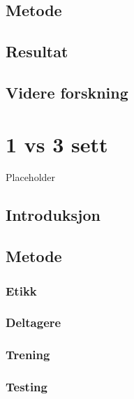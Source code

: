 \documentclass[
]{book}
\begin{document}
\hypertarget{metode-2}{%
\section{Metode}\label{metode-2}}

\hypertarget{resultat}{%
\section{Resultat}\label{resultat}}

\hypertarget{videre-forskning}{%
\section{Videre forskning}\label{videre-forskning}}

\hypertarget{vs-3-sett}{%
\chapter{1 vs 3 sett}\label{vs-3-sett}}

Placeholder

\hypertarget{introduksjon-2}{%
\section{Introduksjon}\label{introduksjon-2}}

\hypertarget{metode-3}{%
\section{Metode}\label{metode-3}}

\hypertarget{etikk}{%
\subsection{Etikk}\label{etikk}}

\hypertarget{deltagere}{%
\subsection{Deltagere}\label{deltagere}}

\hypertarget{trening}{%
\subsection{Trening}\label{trening}}

\hypertarget{testing}{%
\subsection{Testing}\label{testing}}
\end{document}
